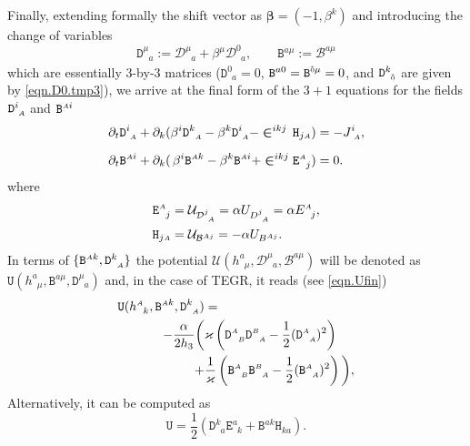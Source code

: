 \documentclass[
10pt, %
a4paper, %
oneside, %
twocolumn,
headinclude,footinclude, %
BCOR5mm, %
]{scrartcl}
\newcommand{\sA}{\mathsmaller A}
\newcommand{\sB}{\mathsmaller B}
\newcommand{\pd}[1]{\partial_{#1}}
\newcommand{\tetrsymbol}{h}
\newcommand{\tetr}[2]{\tetrsymbol^{#1}_{\phantom{#1}#2}}
\newcommand{\detTetr}{\tetrsymbol}
\newcommand{\ET}[2]{E^{#1}_{\phantom{#1}#2}}	%
\newcommand{\Dm}[2]{D_{\phantom{#2}#1}^{#2}}	%
\newcommand{\aD}[2]{\mathcal{D}_{\phantom{#2}#1}^{#2}}	%
\newcommand{\Dfin}[2]{\mathtt{D}_{\phantom{#2}#1}^{#2}}	%
\newcommand{\Hfin}[2]{\mathtt{H}_{#2#1}}	%
\newcommand{\Efin}[2]{\mathtt{E}^{#1}_{\phantom{#1}#2}}	%
\newcommand{\Ufin}{\mathtt{U}}
\newcommand{\Bm}[2]{B^{#1#2}}	%
\newcommand{\aB}[2]{\mathcal{B}^{#1#2}}	%
\newcommand{\Bfin}[2]{\mathtt{B}^{#1#2}}	%
\newcommand{\Bfinmix}[2]{\mathtt{B}^{#1}_{\phantom{#1}#2}}	%
\newcommand{\Um}{U}%
\newcommand{\aU}{\mathcal{U}}%
\newcommand{\LCsymb}{\bm{\in}}    %
\newcommand{\NC}[2]{J^{#2}_{\phantom{#2}#1}}
\newcommand{\indalg}[1]{\hat{\mathsmaller{#1}}}
\newcommand{\shift}[1]{\beta^{#1}}
\begin{document}
	Finally, extending formally the shift vector as $ \bm{\beta}=(-1,\beta^{k}) 
	$ and introducing 
	the 
	change of variables
	\begin{equation}\label{eqn.varDB.final}
		\Dfin{a}{\mu} := \aD{a}{\mu} + \beta^{\mu} \aD{a}{0}, \qquad \Bfin{a}{\mu} := \aB{a}{\mu}
	\end{equation}
	which are essentially $ 3 $-by-$ 3 $ matrices ($ \Dfin{a}{0} = 0$, $ \Bfin{a}{0} = 
	\Bfin{\indalg{0}}{\mu} = 0 $, and $ \Dfin{\indalg{0}}{k} $ are given by \eqref{eqn.D0.tmp3}),
	we arrive at the final form of the $ 3+1 $ equations for the fields $ \Dfin{\sA}{i} $ and $ 
	\Bfin{\sA}{i} $
	\begin{subequations}\label{eqn.PDE.BD.final}
		\begin{align}
			\pd{t} \Dfin{\sA}{i} + \pd{k}(\shift{i} 
			\Dfin{\sA}{k} - \shift{k}\Dfin{\sA}{i}  - \LCsymb^{ikj} \,
			\Hfin{\sA}{j}) & 
			= -\NC{\sA}{i}, \label{eqn.tpo.D}\\[2mm]
			\pd{t} \Bfin{\sA}{i} + \pd{k}(\,\shift{i} 
			\Bfin{\sA}{k} - \shift{k}\Bfin{\sA}{i}  + \LCsymb^{ikj} 
			\Efin{\sA}{j}) & 
			= 0\label{eqn.tpo.B} .
		\end{align}
	\end{subequations}
	where
	\begin{subequations}
		\begin{align}\label{eqn.HE.fin}
			&\Efin{\sA}{j} = \aU_{\aD{\sA}{j}} = \alpha \Um_{\Dm{\sA}{j}}= \alpha \ET{\sA}{j},
			\\
			&\Hfin{\sA}{j} = \aU_{\aB{\sA}{j}} =-\alpha \Um_{\Bm{\sA}{j}}.
		\end{align}
	\end{subequations}
	In terms of $ \{\Bfin{\sA}{k},\Dfin{\sA}{k}\} $ the potential $  
	\aU(\tetr{a}{\mu},\aD{a}{\mu},\aB{a}{\mu}) $ will be denoted as 
	$
	\Ufin(\tetr{a}{\mu},\Bfin{a}{\mu},\Dfin{a}{\mu})  
	$ and, in the case of TEGR, it reads (see \eqref{eqn.Ufin})
	\begin{align}\label{eqn.Ufin0}
		\Ufin(\tetr{\sA}{k},\Bfin{\sA}{k},\Dfin{\sA}{k}) & =  \nonumber\\
		 -\frac{\alpha}{2\detTetr_3} \bigg( 
		& \varkappa \left( \Dfin{\sB}{\sA} \Dfin{\sA}{\sB} - \frac{1}{2} 
		(\Dfin{\sA}{\sA})^2\right) \nonumber\\
		 +
		&\frac{1}{\varkappa} \left( \Bfinmix{\sA}{\sB} \Bfinmix{\sB}{\sA} - \frac{1}{2} 
		(\Bfinmix{\sA}{\sA})^2
		\right)
		\bigg),
	\end{align}
	Alternatively, it can be computed as
	\begin{equation}\label{eqn.U.bdeh}
		\Ufin = \frac{1}{2} ( \Dfin{a}{k} \Efin{a}{k} + \Bfin{a}{k} \Hfin{a}{k} ).
	\end{equation} 
	
\end{document}
